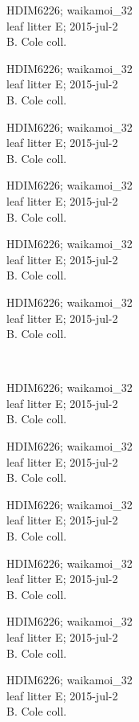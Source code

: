 \documentclass[2pt]{extarticle}
\begin{document}
\noindent
\parbox{0.16\textwidth}{\tiny \raggedright \rule[-0.3\baselineskip]{0pt}{10pt}HDIM6226; waikamoi\_32\\ leaf litter E; 2015-jul-2\\ B. Cole coll.}
\parbox{0.16\textwidth}{\tiny \raggedright \rule[-0.3\baselineskip]{0pt}{10pt}HDIM6226; waikamoi\_32\\ leaf litter E; 2015-jul-2\\ B. Cole coll.}
\parbox{0.16\textwidth}{\tiny \raggedright \rule[-0.3\baselineskip]{0pt}{10pt}HDIM6226; waikamoi\_32\\ leaf litter E; 2015-jul-2\\ B. Cole coll.}
\parbox{0.16\textwidth}{\tiny \raggedright \rule[-0.3\baselineskip]{0pt}{10pt}HDIM6226; waikamoi\_32\\ leaf litter E; 2015-jul-2\\ B. Cole coll.}
\parbox{0.16\textwidth}{\tiny \raggedright \rule[-0.3\baselineskip]{0pt}{10pt}HDIM6226; waikamoi\_32\\ leaf litter E; 2015-jul-2\\ B. Cole coll.}
\parbox{0.16\textwidth}{\tiny \raggedright \rule[-0.3\baselineskip]{0pt}{10pt}HDIM6226; waikamoi\_32\\ leaf litter E; 2015-jul-2\\ B. Cole coll.} \\ 
\vspace{0.001in} 

\noindent
\parbox{0.16\textwidth}{\tiny \raggedright \rule[-0.3\baselineskip]{0pt}{10pt}HDIM6226; waikamoi\_32\\ leaf litter E; 2015-jul-2\\ B. Cole coll.}
\parbox{0.16\textwidth}{\tiny \raggedright \rule[-0.3\baselineskip]{0pt}{10pt}HDIM6226; waikamoi\_32\\ leaf litter E; 2015-jul-2\\ B. Cole coll.}
\parbox{0.16\textwidth}{\tiny \raggedright \rule[-0.3\baselineskip]{0pt}{10pt}HDIM6226; waikamoi\_32\\ leaf litter E; 2015-jul-2\\ B. Cole coll.}
\parbox{0.16\textwidth}{\tiny \raggedright \rule[-0.3\baselineskip]{0pt}{10pt}HDIM6226; waikamoi\_32\\ leaf litter E; 2015-jul-2\\ B. Cole coll.}
\parbox{0.16\textwidth}{\tiny \raggedright \rule[-0.3\baselineskip]{0pt}{10pt}HDIM6226; waikamoi\_32\\ leaf litter E; 2015-jul-2\\ B. Cole coll.}
\parbox{0.16\textwidth}{\tiny \raggedright \rule[-0.3\baselineskip]{0pt}{10pt}HDIM6226; waikamoi\_32\\ leaf litter E; 2015-jul-2\\ B. Cole coll.} \\ 
\vspace{0.001in} 
\end{document}
